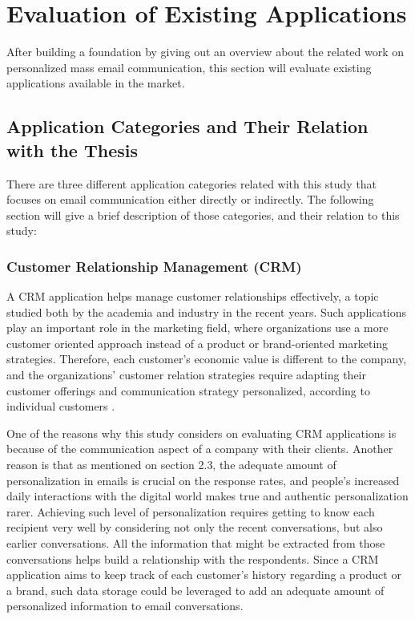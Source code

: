 \chapter{Evaluation of Existing Applications}
\label{chp:3:EvalExisAppl}
After building a foundation by giving out an overview about the related work on personalized mass email communication, this section will evaluate existing applications available in the market. 

\section{Application Categories and Their Relation with the Thesis}
\label{sec:3.1:SystCate}

There are three different application categories related with this study that focuses on email communication either directly or indirectly. The following section will give a brief description of those categories, and their relation to this study:

\subsection{Customer Relationship Management (CRM)}
\label{subsec:3.1.1:Cust}
A \ac{CRM} application helps manage customer relationships effectively, a topic studied both by the academia and industry in the recent years. Such applications play an important role in the marketing field, where organizations use a more customer oriented approach instead of a product or brand-oriented marketing strategies. Therefore, each customer's economic value is different to the company, and the organizations' customer relation strategies require adapting their customer offerings and communication strategy personalized, according to individual customers \citep{Reinartz2004}. 
\vspace{1cm}

One of the reasons why this study considers on evaluating \ac{CRM} applications is because of the communication aspect of a company with their clients. Another reason is that as mentioned on section 2.3, the adequate amount of personalization in emails is crucial on the response rates, and people's increased daily interactions with the digital world makes true and authentic personalization rarer. Achieving such level of personalization requires getting to know each recipient very well by considering not only the recent conversations, but also earlier conversations. All the information that might be extracted from those conversations helps build a relationship with the respondents. Since a \ac{CRM} application aims to keep track of each customer's history regarding a product or a brand, such data storage could be leveraged to add an adequate amount of personalized information to email conversations. 


